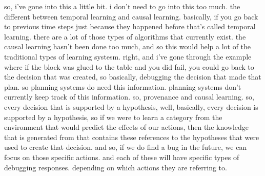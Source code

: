so, i've gone into this a little bit.
i don't need to go into this too much.
the different between temporal learning and causal learning.
basically, if you go back to previous time steps just because they happened before that's called temporal learning.
there are a lot of those types of algorithms that currently exist.
the causal learning hasn't been done too much, and so this would help a lot of the traditional types of learning systesm.
right, and i've gone through the example where if the block was glued to the table and you did fail, you could go back to the decision that was created, so basically, debugging the decision that made that plan.
so planning systems do need this information.
planning systems don't currently keep track of this information.
so, provenance and causal learning.
so, every decision that is supported by a hypothesis, well, basically, every decision is supported by a hypothesis, so if we were to learn a category from the environment that would predict the effects of our actions, then the knowledge that is generated from that contains these references to the hypotheses that were used to create that decision.
and so, if we do find a bug in the future, we can focus on those specific actions.
and each of these will have specific types of debugging responses.
depending on which actions they are referring to.

